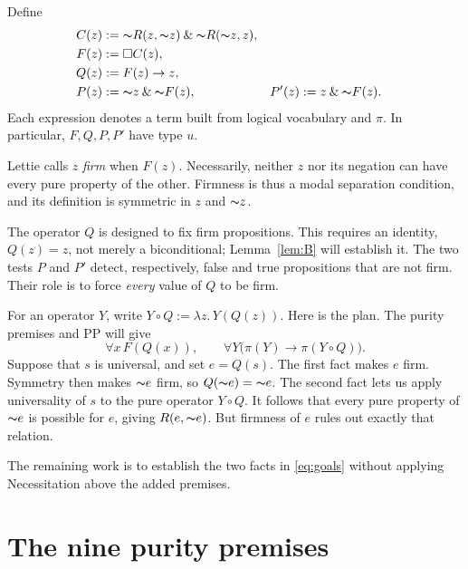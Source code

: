 \documentclass[12pt,leqno]{article}
\newcommand{\AND}{\ensuremath{\mathbin{\&}}}
\newcommand{\IC}{\ensuremath{\rightarrow}}
\newcommand{\NOT}{\ensuremath{\text{$\thicksim$}}}
\theoremstyle{plain}
\begin{document}
Define
\begin{align}
 C(z)&:=\NOT R(z,\NOT z)\AND\NOT R(\NOT z,z), \label{eq:C}\\
 F(z)&:=\Box C(z), \label{eq:F}\\
 Q(z)&:=F(z)\IC z, \label{eq:Q}\\
 P(z)&:=\NOT z\AND\NOT F(z),&
 P'(z)&:=z\AND\NOT F(z). \label{eq:tests}
\end{align}
Each expression denotes a term built from logical vocabulary and
\(\pi\). In particular, \(F,Q,P,P'\) have type \(u\).

Lettie calls \(z\) \emph{firm} when \(F(z)\). Necessarily, neither \(z\)
nor its negation can have every pure property of the other. Firmness is
thus a modal separation condition, and its definition is symmetric in
\(z\) and \(\NOT z\).

The operator \(Q\) is designed to fix firm propositions. This requires an
identity, \(Q(z)=z\), not merely a biconditional; Lemma~\ref{lem:B}
will establish it. The two tests \(P\) and \(P'\) detect, respectively,
false and true propositions that are not firm. Their role is to force
\emph{every} value of \(Q\) to be firm.

For an operator \(Y\), write \(Y\circ Q:=\lambda z.\,Y(Q(z))\).
Here is the plan. The purity premises and PP will give
\begin{equation}
 \forall x\,F(Q(x)),
 \qquad
 \forall Y\bigl(\pi(Y)\IC\pi(Y\circ Q)\bigr).
 \label{eq:goals}
\end{equation}
Suppose that \(s\) is universal, and set \(e=Q(s)\).
The first fact makes \(e\) firm. Symmetry then makes \(\NOT e\) firm,
so \(Q(\NOT e)=\NOT e\). The second fact lets us apply universality of
\(s\) to the pure operator \(Y\circ Q\). It follows that every pure
property of \(\NOT e\) is possible for \(e\), giving \(R(e,\NOT e)\).
But firmness of \(e\) rules out exactly that relation.

The remaining work is to establish the two facts in \eqref{eq:goals}
without applying Necessitation above the added premises.

\section{The nine purity premises}
\end{document}
